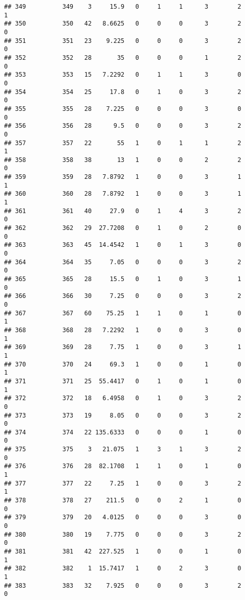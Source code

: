 \documentclass[
]{article}
\begin{document}
\begin{verbatim}
## 349          349    3     15.9   0     1     1      3        2         1
## 350          350   42   8.6625   0     0     0      3        2         0
## 351          351   23    9.225   0     0     0      3        2         0
## 352          352   28       35   0     0     0      1        2         0
## 353          353   15   7.2292   0     1     1      3        0         0
## 354          354   25     17.8   0     1     0      3        2         0
## 355          355   28    7.225   0     0     0      3        0         0
## 356          356   28      9.5   0     0     0      3        2         0
## 357          357   22       55   1     0     1      1        2         1
## 358          358   38       13   1     0     0      2        2         0
## 359          359   28   7.8792   1     0     0      3        1         1
## 360          360   28   7.8792   1     0     0      3        1         1
## 361          361   40     27.9   0     1     4      3        2         0
## 362          362   29  27.7208   0     1     0      2        0         0
## 363          363   45  14.4542   1     0     1      3        0         0
## 364          364   35     7.05   0     0     0      3        2         0
## 365          365   28     15.5   0     1     0      3        1         0
## 366          366   30     7.25   0     0     0      3        2         0
## 367          367   60    75.25   1     1     0      1        0         1
## 368          368   28   7.2292   1     0     0      3        0         1
## 369          369   28     7.75   1     0     0      3        1         1
## 370          370   24     69.3   1     0     0      1        0         1
## 371          371   25  55.4417   0     1     0      1        0         1
## 372          372   18   6.4958   0     1     0      3        2         0
## 373          373   19     8.05   0     0     0      3        2         0
## 374          374   22 135.6333   0     0     0      1        0         0
## 375          375    3   21.075   1     3     1      3        2         0
## 376          376   28  82.1708   1     1     0      1        0         1
## 377          377   22     7.25   1     0     0      3        2         1
## 378          378   27    211.5   0     0     2      1        0         0
## 379          379   20   4.0125   0     0     0      3        0         0
## 380          380   19    7.775   0     0     0      3        2         0
## 381          381   42  227.525   1     0     0      1        0         1
## 382          382    1  15.7417   1     0     2      3        0         1
## 383          383   32    7.925   0     0     0      3        2         0

\end{verbatim}
\end{document}
